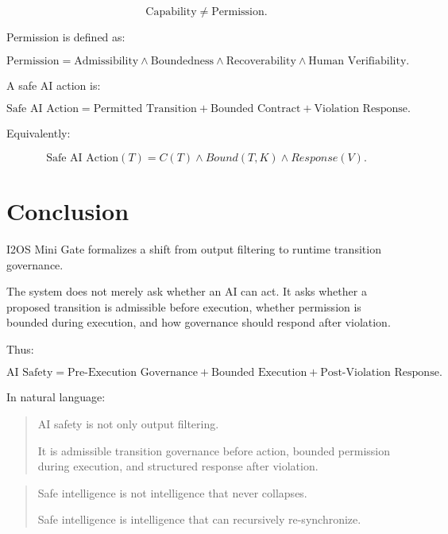 \documentclass[11pt,a4paper]{article}
\begin{document}
\[
\mathrm{Capability} \neq \mathrm{Permission}.
\]

Permission is defined as:

\[
\text{Permission}
=
\text{Admissibility}
\land
\text{Boundedness}
\land
\text{Recoverability}
\land
\text{Human Verifiability}.
\]

A safe AI action is:

\[
\text{Safe AI Action}
=
\text{Permitted Transition}
+
\text{Bounded Contract}
+
\text{Violation Response}.
\]

Equivalently:

\[
\text{Safe AI Action}(T)
=
C(T)
\land
Bound(T,K)
\land
Response(V).
\]

\section{Conclusion}

I2OS Mini Gate formalizes a shift from output filtering to runtime transition governance.

The system does not merely ask whether an AI can act.
It asks whether a proposed transition is admissible before execution, whether permission is bounded during execution, and how governance should respond after violation.

Thus:

\[
\text{AI Safety}
=
\text{Pre-Execution Governance}
+
\text{Bounded Execution}
+
\text{Post-Violation Response}.
\]

In natural language:

\begin{quote}
AI safety is not only output filtering.

It is admissible transition governance before action,
bounded permission during execution,
and structured response after violation.
\end{quote}

\begin{quote}
Safe intelligence is not intelligence that never collapses.

Safe intelligence is intelligence that can recursively re-synchronize.
\end{quote}
\end{document}
